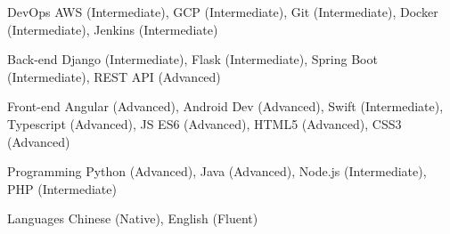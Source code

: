 

\begin{cvskills}

  \cvskill
    {DevOps} %
    {AWS (Intermediate), GCP (Intermediate), Git (Intermediate), Docker (Intermediate), Jenkins (Intermediate)} %

  \cvskill
    {Back-end} %
    {Django (Intermediate), Flask (Intermediate), Spring Boot (Intermediate), REST API (Advanced)} %

  \cvskill
    {Front-end} %
    {Angular (Advanced), Android Dev (Advanced), Swift (Intermediate), Typescript (Advanced), JS ES6 (Advanced), HTML5 (Advanced), CSS3 (Advanced)} %

  \cvskill
    {Programming} %
    {Python (Advanced), Java (Advanced), Node.js (Intermediate), PHP (Intermediate)} %

  \cvskill
    {Languages} %
    {Chinese (Native), English (Fluent)} %

\end{cvskills}
